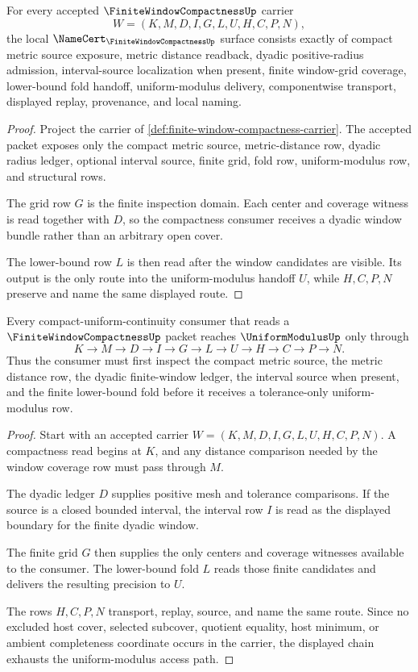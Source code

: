 \begin{theorem}
\label{thm:finite-window-compactness-namecert-obligations}
For every accepted $\FiniteWindowCompactnessUp$ carrier
$$
W=(K,M,D,I,G,L,U,H,C,P,N),
$$
the local $\NameCert_{\FiniteWindowCompactnessUp}$ surface consists exactly of compact metric source exposure, metric distance readback, dyadic positive-radius admission, interval-source localization when present, finite window-grid coverage, lower-bound fold handoff, uniform-modulus delivery, componentwise transport, displayed replay, provenance, and local naming.
\end{theorem}
\begin{proof}
Project the carrier of \autoref{def:finite-window-compactness-carrier}. The accepted packet exposes only the compact metric source, metric-distance row, dyadic radius ledger, optional interval source, finite grid, fold row, uniform-modulus row, and structural rows.

The grid row $G$ is the finite inspection domain. Each center and coverage witness is read together with $D$, so the compactness consumer receives a dyadic window bundle rather than an arbitrary open cover.

The lower-bound row $L$ is then read after the window candidates are visible. Its output is the only route into the uniform-modulus handoff $U$, while $H,C,P,N$ preserve and name the same displayed route.
\end{proof}

\begin{theorem}
\label{thm:finite-window-compactness-uniform-modulus-route}
Every compact-uniform-continuity consumer that reads a $\FiniteWindowCompactnessUp$ packet reaches $\UniformModulusUp$ only through
$$
K \to M \to D \to I \to G \to L \to U \to H \to C \to P \to N.
$$
Thus the consumer must first inspect the compact metric source, the metric distance row, the dyadic finite-window ledger, the interval source when present, and the finite lower-bound fold before it receives a tolerance-only uniform-modulus row.
\end{theorem}
\begin{proof}
Start with an accepted carrier $W=(K,M,D,I,G,L,U,H,C,P,N)$. A compactness read begins at $K$, and any distance comparison needed by the window coverage row must pass through $M$.

The dyadic ledger $D$ supplies positive mesh and tolerance comparisons. If the source is a closed bounded interval, the interval row $I$ is read as the displayed boundary for the finite dyadic window.

The finite grid $G$ then supplies the only centers and coverage witnesses available to the consumer. The lower-bound fold $L$ reads those finite candidates and delivers the resulting precision to $U$.

The rows $H,C,P,N$ transport, replay, source, and name the same route. Since no excluded host cover, selected subcover, quotient equality, host minimum, or ambient completeness coordinate occurs in the carrier, the displayed chain exhausts the uniform-modulus access path.
\end{proof}

